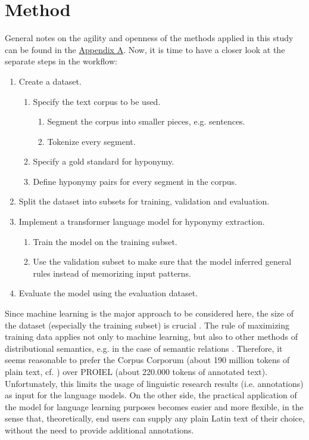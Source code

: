 \documentclass[runningheads]{llncs}
\begin{document}
\section{Method}
General notes on the agility and openness of the methods applied in this study can be found in the \hyperref[sec:appendixA]{Appendix A}. Now, it is time to have a closer look at the separate steps in the workflow:
\begin{enumerate}
         \item Create a dataset.
         \begin{enumerate}
		\item Specify the text corpus to be used.
		 \begin{enumerate}
			\item Segment the corpus into smaller pieces, e.g. sentences.
			\item Tokenize every segment.
		\end{enumerate}
		\item Specify a gold standard for hyponymy.
		\item Define hyponymy pairs for every segment in the corpus.
	\end{enumerate}
         \item Split the dataset into subsets for training, validation and evaluation.
         \item Implement a transformer language model \parencite{vaswaniAttentionAllYou2017} for hyponymy extraction.
         \begin{enumerate}
		\item Train the model on the training subset.
		\item Use the validation subset to make sure that the model inferred general rules instead of memorizing input patterns.
	\end{enumerate}
         \item Evaluate the model using the evaluation dataset.
\end{enumerate}
Since machine learning is the major approach to be considered here, the size of the dataset (especially the training subset) is crucial \parencite[13]{hestnessDeepLearningScaling2017}. The rule of maximizing training data applies not only to machine learning, but also to other methods of distributional semantics, e.g. in the case of semantic relations \parencite[27]{herbelotBuildingSharedWorld2015}. Therefore, it seems reasonable to prefer the Corpus Corporum (about 190 million tokens of plain text, cf. \textcite{roelliCorpusCorporumNew2014}) over PROIEL (about 220.000 tokens of annotated text). Unfortunately, this limits the usage of linguistic research results (i.e. annotations) as input for the language models. On the other side, the practical application of the model for language learning purposes becomes easier and more flexible, in the sense that, theoretically, end users can supply any plain Latin text of their choice, without the need to provide additional annotations.
\end{document}
